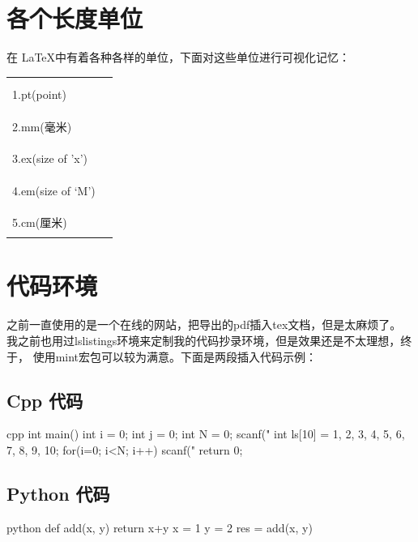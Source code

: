 \documentclass[fontset=windows, 12pt]{article}
\newcommand{\red}[1]{\textcolor{red}{#1}}
\begin{document}
\section{各个长度单位}
在 \LaTeX 中有着各种各样的单位，下面对这些单位进行可视化记忆：
\begin{example}
\begin{tabular}{l|l}
    \hline\\
    1.pt(point) & \red{\rule{1pt}{1pt}}\\
    \hline\\
    2.mm(毫米) &\red{\rule{1mm}{1mm}}\\
    \hline\\
    3.ex(size of 'x') &\red{\rule{1ex}{1ex}}\\
    \hline\\
    4.em(size of `M') &\red{\rule{1em}{1em}}\\
    \hline\\
    5.cm(厘米) &\red{\rule{1cm}{1cm}}\\
    \hline
\end{tabular}
\end{example}

\clearpage

\section{代码环境}
之前一直使用的是一个在线的网站，把导出的pdf插入tex文档，但是太麻烦了。
我之前也用过lslistings环境来定制我的代码抄录环境，但是效果还是不太理想，终于，
使用mint宏包可以较为满意。下面是两段插入代码示例：

\subsection{Cpp 代码}
\begin{code}{cpp}
int main()
{
    int i = 0;
    int j = 0;
    int N = 0;
    scanf("%
    int ls[10] = {1, 2, 3, 4, 5, 6, 7, 8, 9, 10};
    for(i=0; i<N; i++){
        scanf("%
    }
    return 0;
}
\end{code}

\subsection{Python 代码}
\begin{code}{python}
def add(x, y)
    return x+y
x = 1
y = 2
res = add(x, y)
\end{code}
\newpage
\end{document}

